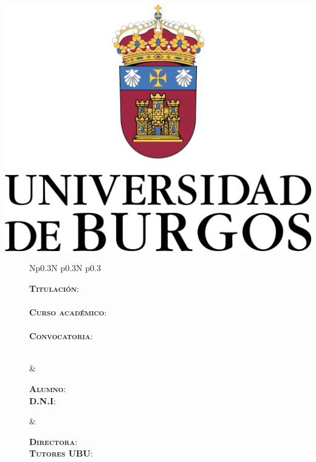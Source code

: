 \begin{titlepage}
\begin{center}
    \includegraphics[scale=0.5]{figuras/UBU.png}

\end{center}


\begin{figure}[b]
    \centering
    \begin{tabular}{Np{0.3\linewidth}N p{0.3\linewidth}N p{0.3\linewidth}}
        \begin{minipage}[t]{\linewidth}
            \raggedright
            \textsc{\large \textbf{Titulación}:}\\
            {\large \CAREER}\\
            \vspace{0.2cm}
            \textsc{\large \textbf{Curso académico}:}\\
            {\large \CURSO}\\
            \vspace{0.2cm}
            \textsc{\large \textbf{Convocatoria}:}\\
            {\large \CONV}\\
        \end{minipage} &
        \begin{minipage}[t]{\linewidth}
            \raggedright
            \textsc{\large \textbf{Alumno}:}
            \AUTHORNAMEUNO\\
            \vspace{0.73cm}
            \textsc{\large \textbf{D.N.I}:} \DNI\\
        \end{minipage} &
        \begin{minipage}[t]{\linewidth}
            \raggedright
            \textsc{\large \textbf{Directora}: \DIRECTORA}\\
            \vspace{0.73cm}
            \textsc{\large \textbf{Tutores UBU}: \TUTORES}\\
        \end{minipage} \\
    \end{tabular}
\end{figure}


\end{titlepage}